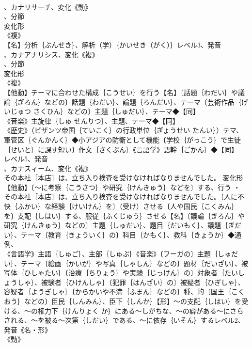 \documentclass[8pt]{extreport}
\begin{document}
\begin{CJK}{UTF8}{min}
\\	、カナリサーチ、変化《動》
\\	、分節
\\	変化形 
\\	《複》
\\	【名】分析｛ぶんせき｝、解析（学）｛かいせき（がく）｝レベル3、発音
\\	、カナアナリシス、変化《複》
\\	、分節
\\	変化形 
\\	《複》
\\	【他動】テーマに合わせた構成｛こうせい｝を行う【名】〔話題｛わだい｝や議論｛ぎろん｝などの〕話題｛わだい｝、論題｛ろんだい｝、テーマ〔芸術作品｛げいじゅつ さくひん｝などの〕主題｛しゅだい｝、テーマ◆【同】
\\	《音楽》主旋律｛しゅ せんりつ｝、主題、テーマ◆【同】
\\	《歴史》（ビザンツ帝国｛ていこく｝の行政単位｛ぎょうせい たんい｝）テマ、軍管区｛ぐんかんく｝◆小アジアの防衛として機能〔学校｛がっこう｝で生徒｛せいと｝に課す短い〕作文｛さくぶん｝《言語学》語幹｛ごかん｝◆【同】
\\	レベル5、発音
\\	、カナスィーム、変化《複》
\\	その本社［本店］は、立ち入り検査を受けなければなりませんでした。	変化形 
\\	【他動】〔～に考察｛こうさつ｝や研究｛けんきゅう｝などを〕する、行う ・
\\	その本社［本店］は、立ち入り検査を受けなければなりませんでした。〔人に不快｛ふかい｝な経験｛けいけん｝を〕（受け）させる〔人や国民｛こくみん｝を〕支配｛しはい｝する、服従｛ふくじゅう｝させる【名】〔議論｛ぎろん｝や研究｛けんきゅう｝などの〕主題｛しゅだい｝、題目｛だいもく｝、議題｛ぎだい｝、テーマ〔教育｛きょういく｝の〕科目｛かもく｝、教科｛きょうか｝◆通例、
\\	《言語学》主語｛しゅご｝、主部｛しゅぶ｝《音楽》〔フーガの〕主題｛しゅだい｝、テーマ〔絵画｛かいが｝や写真｛しゃしん｝などの〕題材｛だいざい｝、被写体｛ひしゃたい｝〔治療｛ちりょう｝や実験｛じっけん｝の〕対象者｛たいしょうしゃ｝、被験者｛ひけんしゃ｝〔犯罪｛はんざい｝の〕被疑者｛ひぎしゃ｝、容疑者｛ようぎしゃ｝〔からかいや不満｛ふまん｝などの〕種、的〔国王｛こくおう｝などの〕臣民｛しんみん｝、臣下｛しんか｝【形】～の支配｛しはい｝を受ける、～の権力下｛けんりょく か｝にある～しがちな、～の癖がある～にさらされる、～を被る～次第｛しだい｝である、～に依存｛いそん｝するレベル2、発音《名・形》
\\	《動》

\end{CJK}
\end{document}
